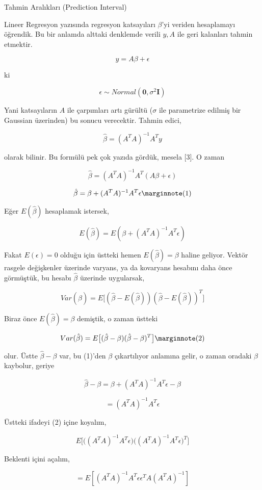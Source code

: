 \documentclass[12pt,fleqn]{article}\usepackage{../../common}
\begin{document}
Tahmin Aralıkları (Prediction Interval)

Lineer Regresyon yazısında regresyon katsayıları $\beta$'yi veriden
hesaplamayı öğrendik. Bu bir anlamda alttaki denklemde verili $y,A$ ile
geri kalanları tahmin etmektir. 

$$ y = A\beta + \epsilon  $$

ki

$$ \epsilon \sim Normal(\mathbf{0}, \sigma^2 \mathbf{I}) $$

Yani katsayıların $A$ ile çarpımları artı gürültü ($\sigma$ ile parametrize
edilmiş bir Gaussian üzerinden) bu sonucu verecektir. Tahmin edici,

$$ \hat{\beta} = (A^TA)^{-1}A^Ty $$

olarak bilinir. Bu formülü pek çok yazıda gördük, mesela [3]. O zaman

$$ \hat{\beta} = (A^TA)^{-1}A^T(A\beta + \epsilon) $$

$$ 
\hat{\beta} = \beta  + (A^TA)^{-1}A^T \epsilon 
\mlabel{1}
$$

Eğer $E( \hat{\beta} )$ hesaplamak istersek, 

$$ E( \hat{\beta} ) = E(  \beta  + (A^TA)^{-1}A^T \epsilon )$$

Fakat $E(\epsilon) = 0$ olduğu için üstteki hemen $ E( \hat{\beta} ) =
\beta $ haline geliyor. Vektör rasgele değişkenler üzerinde varyans, ya da
kovaryans hesabını daha önce görmüştük, bu hesabı $\hat{\beta}$ üzerinde
uygularsak,

$$ Var(\hat{\beta}) = 
E \big[
(\hat{\beta} - E(\hat{\beta}))  
(\hat{\beta} - E(\hat{\beta}))^T 
\big]
$$

Biraz önce $E( \hat{\beta} ) = \beta $ demiştik, o zaman üstteki 

$$ 
Var(\hat{\beta}) = 
E \big[
(\hat{\beta} - \beta)  
(\hat{\beta} - \beta)^T 
\big]
\mlabel{2}
$$

olur. Üstte $\hat{\beta} - \beta$ var, bu (1)'den $\beta$ çıkartılıyor
anlamına gelir, o zaman oradaki $\beta$ kaybolur, geriye 

$$ \hat{\beta} - \beta = \beta  + (A^TA)^{-1}A^T \epsilon - \beta 
$$

$$ = (A^TA)^{-1}A^T \epsilon   $$

Üstteki ifadeyi (2) içine koyalım, 

$$ E \bigg[
\big( (A^TA)^{-1}A^T \epsilon \big)
\big( (A^TA)^{-1}A^T \epsilon \big)^T
\bigg]
 $$

Beklenti içini açalım, 

$$  = E [(A^TA)^{-1}A^T \epsilon \epsilon^T A (A^TA)^{-1}] $$
\end{document}
